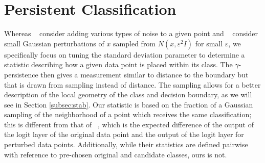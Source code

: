 \chapter{Persistent Classification}

Whereas ~\cite{roth19aodds} consider adding various types of noise to a given point and ~\cite{hosseini2019odds} consider small Gaussian perturbations of $x$ sampled from $N(x,\varepsilon^2 I)$ for small $\varepsilon$, %
we specifically focus on %
tuning the standard deviation parameter to determine a statistic describing how a given data point is placed within its class. The $\gamma$-persistence then gives a measurement similar to distance to the boundary but that is drawn from sampling instead of distance. The sampling allows for a better description of the local geometry of the class and decision boundary, as we will see in Section \ref{subsec:stab}. Our statistic is based on the fraction of a Gaussian sampling of the neighborhood of a point which receives the same classification; this is different from that of ~\cite{roth19aodds}, which is the expected difference of the output of the logit layer of the original data point and the output of the logit layer for perturbed data points.  Additionally, while their statistics are defined pairwise with reference to pre-chosen original and candidate classes, ours is not.







